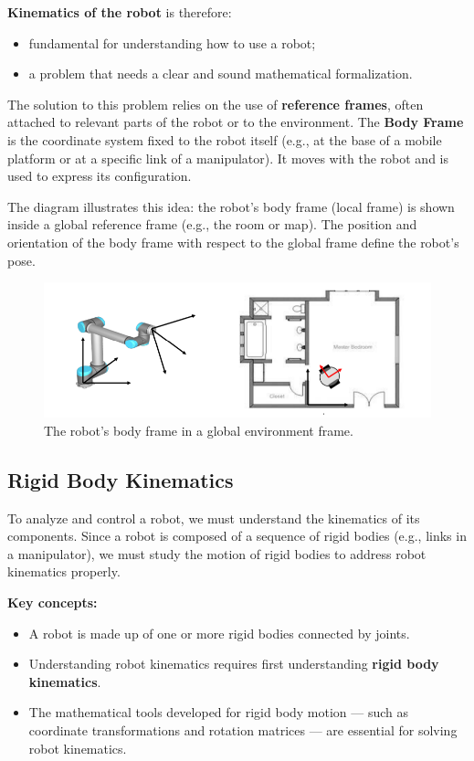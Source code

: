 \textbf{Kinematics of the robot} is therefore:
\begin{itemize}
  \item fundamental for understanding how to use a robot;
  \item a problem that needs a clear and sound mathematical formalization.
\end{itemize}

The solution to this problem relies on the use of \textbf{reference frames}, often attached to relevant parts of the robot or to the environment. The \textbf{Body Frame} is the coordinate system fixed to the robot itself (e.g., at the base of a mobile platform or at a specific link of a manipulator). It moves with the robot and is used to express its configuration.

The diagram illustrates this idea: the robot's body frame (local frame) is shown inside a global reference frame (e.g., the room or map). The position and orientation of the body frame with respect to the global frame define the robot's pose.

\begin{figure}[H]
  \centering
  \includegraphics[width=\linewidth]{imgs/part_of_interest_kinematics.png}
  \caption{The robot’s body frame in a global environment frame.}
\end{figure}

\hfill

\subsection{Rigid Body Kinematics}

To analyze and control a robot, we must understand the kinematics of its components. Since a robot is composed of a sequence of rigid bodies (e.g., links in a manipulator), we must study the motion of rigid bodies to address robot kinematics properly.

\textbf{Key concepts:}
\begin{itemize}
  \item A robot is made up of one or more rigid bodies connected by joints.
  \item Understanding robot kinematics requires first understanding \textbf{rigid body kinematics}.
  \item The mathematical tools developed for rigid body motion — such as coordinate transformations and rotation matrices — are essential for solving robot kinematics.
\end{itemize}

